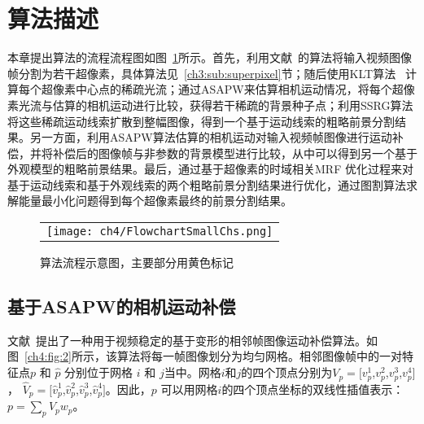  \section{算法描述}
 \label{ch4:sec:algorithm}
 本章提出算法的流程流程图如图~\ref{ch4:fig:1}所示。首先，利用文献~的算法将输入视频图像帧分割为若干超像素，具体算法见~\ref{ch3:sub:superpixel}节；随后使用KLT算法~\cite{KLT} 计算每个超像素中心点的稀疏光流；通过ASAPW来估算相机运动情况，将每个超像素光流与估算的相机运动进行比较，获得若干稀疏的背景种子点；利用SSRG算法将这些稀疏运动线索扩散到整幅图像，得到一个基于运动线索的粗略前景分割结果。另一方面，利用ASAPW算法估算的相机运动对输入视频帧图像进行运动补偿，并将补偿后的图像帧与非参数的背景模型进行比较，从中可以得到另一个基于外观模型的粗略前景结果。最后，通过基于超像素的时域相关MRF 优化过程来对基于运动线索和基于外观线索的两个粗略前景分割结果进行优化，通过图割算法\cite{graphcut04}求解能量最小化问题得到每个超像素最终的前景分割结果。

\begin{figure}[!htbp]
\begin{center}
\begin{tabular}{c}
  \texttt{[image: ch4/FlowchartSmallChs.png]}
  \end{tabular}
\end{center}
\caption{算法流程示意图，主要部分用黄色标记}
\label{ch4:fig:1}       %
\end{figure}


\subsection{基于ASAPW的相机运动补偿}
\label{ch4:sec:sub:asap}
文献~提出了一种用于视频稳定的基于变形的相邻帧图像运动补偿算法。如图~\ref{ch4:fig:2}所示，该算法将每一帧图像划分为均匀网格。相邻图像帧中的一对特征点\(p\) 和 $\hat{p}$ 分别位于网格 \(i\) 和 \(j\)当中。网格$i$和$j$的四个顶点分别为${V}_{p}=[{v}^{1}_{p}$,${v}^{2}_{p}$,${v}^{3}_{p}$,${v}^{4}_{p}]$， ${\hat{V}_{p}}=[\hat{v}^{1}_{p}$,$\hat{v}^{2}_{p}$,$\hat{v}^{3}_{p}$,$\hat{v}^{4}_{p}]$。因此，\(p\) 可以用网格\(i\)的四个顶点坐标的双线性插值表示：$p=\sum_{p}{{V}_{p}{w}_{p}}$。

